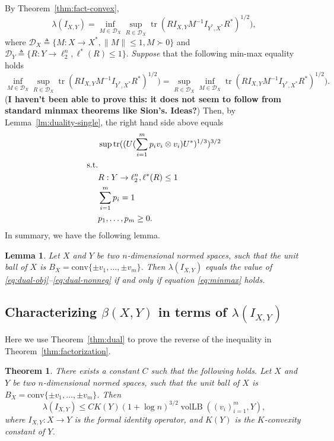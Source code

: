 \documentclass[12pt]{article}
\newtheorem{theorem}{Theorem}
\newtheorem{lemma}{Lemma}
\newcommand{\eqdef}{\triangleq}
\DeclareMathOperator{\vollb}{volLB}
\DeclareMathOperator{\tr}{tr}
\begin{document}
{By Theorem~\ref{thm:fact-convex}, 
\[
\lambda(I_{X,Y}) = 
\inf_{M \in \mathcal{D}_X} \sup_{R \in \mathcal{D}_X} 
\tr(RI_{X,Y}M^{-1}I_{Y^*,X^*}R^*)^{1/2}),
\]
where $\mathcal{D}_X \eqdef \{M: X \to X^*, \|M\|\le 1, M \succ 0\}$
and $\mathcal{D}_Y \eqdef \{R: Y \to \ell_2^n, \ell^*(R) \le
1\}$. \emph{Suppose} that the following min-max equality holds
\begin{equation}
  \label{eq:minmax}
  \inf_{M \in \mathcal{D}_X} \sup_{R \in \mathcal{D}_X} 
  \tr(RI_{X,Y}M^{-1}I_{Y^*,X^*}R^*)^{1/2})
  = 
  \sup_{R \in \mathcal{D}_X} \inf_{M \in \mathcal{D}_X} 
  \tr(RI_{X,Y}M^{-1}I_{Y^*,X^*}R^*)^{1/2}).
\end{equation}
(\textbf{I haven't been able to prove this: it does not seem to follow
  from standard minmax theorems like Sion's. Ideas?}) Then, by
Lemma~\ref{lm:duality-single}, the right hand side above equals 
\begin{align}
  &\sup \tr((U(\sum_{i = 1}^m{p_i v_i \otimes  v_i})U^*)^{1/3})^{3/2}\label{eq:dual-obj}\\
  \text{s.t.}\notag\\
  &R: Y \to \ell_2^n, \ell^*(R) \le 1 \label{eq:dual-ellstar}\\
  &\sum_{i = 1}^m{p_i} = 1\label{eq:dual-prob}\\
  &p_1, \ldots, p_m \ge 0. \label{eq:dual-nonneg}
\end{align}
In summary, we have the following lemma.

\begin{lemma}
  Let $X$ and $Y$ be two $n$-dimensional normed
  spaces, such that the unit ball of $X$ is $B_X = \mathrm{conv}\{\pm
  v_1, \ldots, \pm v_m\}$. Then $\lambda(I_{X,Y})$ equals
  the value of \eqref{eq:dual-obj}--\eqref{eq:dual-nonneg} if and only
  if equation \eqref{eq:minmax} holds. 
\end{lemma} }%

\subsection{Characterizing $\beta(X,Y)$ in terms of $\lambda(I_{X,Y})$}

Here we use Theorem~\ref{thm:dual} to prove the reverse of the
inequality in Theorem~\ref{thm:factorization}. 

\begin{theorem}\label{thm:fact-vollb}
  There exists a constant $C$ such that the following holds. Let $X$
  and $Y$ be two $n$-dimensional normed spaces, such that the unit
  ball of $X$ is $B_X = \mathrm{conv}\{\pm v_1, \ldots, \pm v_m\}$. Then
  \[
  \lambda(I_{X,Y}) \le C K(Y) (1 + \log n)^{3/2} \vollb((v_i)_{i =
    1}^m, Y),
  \]
  where $I_{X,Y}:X \to Y$ is the formal identity operator, and $K(Y)$
  is the $K$-convexity constant of $Y$. 
\end{theorem}
\end{document}
